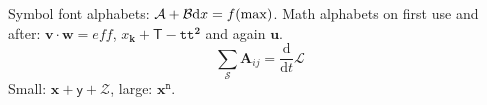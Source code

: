 \documentclass{article}
\begin{document}
Symbol font alphabets: $\mathcal{A}+\mathcal B \mathrm{d}x = \mathnormal{f}(\mathrm{max})$.
Math alphabets on first use and after: $\mathbf{v}\cdot\mathbf{w} = \mathit{eff}$,
$x_{\mathbf{k}} + \mathsf{T} - \mathtt{tt}^{\mathbf{2}}$ and again $\mathbf{u}$.
\[ \sum_{\mathcal{S}} \mathbf{A}_{\mathit{ij}} = \frac{\mathrm{d}}{\mathrm{d}t}\mathcal{L} \]
{\small Small: $\mathbf{x}+\mathsf{y}+\mathcal{Z}$}, {\large large: $\mathbf{x}^{\mathtt{n}}$}.
\end{document}
